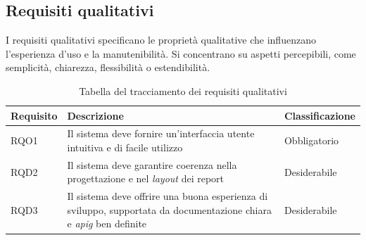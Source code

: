     \subsection{Requisiti qualitativi}
        I requisiti qualitativi specificano le proprietà qualitative che influenzano l'esperienza d'uso e la manutenibilità. Si concentrano su aspetti percepibili, come semplicità, chiarezza, flessibilità o estendibilità.\\
        \begin{table}[H]%
            \caption{Tabella del tracciamento dei requisiti qualitativi}
            \label{tab:requisiti-qualitativi}
            \begin{tabularx}{\textwidth}{|lXl|}
            \hline\hline
            \rowcolor{gray!40}
            \textbf{Requisito} & \textbf{Descrizione} & \textbf{Classificazione}\\
            \hline
            RQO1    & Il sistema deve fornire un'interfaccia utente intuitiva e di facile utilizzo & Obbligatorio\\
            \hline
            RQD2    & Il sistema deve garantire coerenza nella progettazione e nel \emph{layout} dei report & Desiderabile\\
            \hline
            RQD3    & Il sistema deve offrire una buona esperienza di sviluppo, supportata da documentazione chiara e \emph{\gls{apig}} ben definite & Desiderabile\\
            \hline
            \end{tabularx}
        \end{table}%

